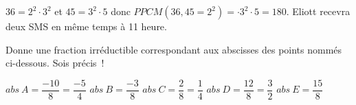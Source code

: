 \documentclass[parskip=half-,twoside=semi, DIV=12, 12pt]{scrartcl}
\begin{document}
\begin{soltransferer}
    \(36 = 2^2 \cdot 3^2\) et \(45 = 3^2 \cdot 5\) donc \(PPCM(36,45=2^2) = \cdot 3^2 \cdot 5 = 180\). Eliott recevra deux SMS en même temps à 11 heure.
\end{soltransferer}
\begin{appliquer}[points=2]
    Donne une fraction irréductible correspondant aux abscisses des points
    nommés ci-dessous. Sois précis~!
    \begin{center}
        
    \end{center}
\end{appliquer}
\begin{solappliquer}
    \par
    \(abs~A = \dfrac{-10}{8} = \dfrac{-5}{4}\)
    \hfill\(abs~B = \dfrac{-3}{8}\)
    \hfill\(abs~C = \dfrac{2}{8}=\dfrac{1}{4}\)
    \hfill\(abs~D = \dfrac{12}{8}=\dfrac{3}{2}\)
    \hfill\(abs~E = \dfrac{15}{8}\)
\end{solappliquer}
 \printallsolutions[headings=false]
\end{document}
